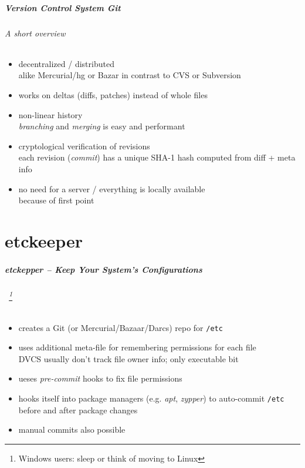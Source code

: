 \documentclass[english,hyperref={pdfpagelabels=false},aspectratio=169]{beamer}
\begin{document}
\begin{frame}[label=git]
  \frametitle{Version Control System \textit{Git}}
  \framesubtitle{A short overview}
  \begin{itemize}
    \item decentralized / distributed\\
      {\scriptsize alike Mercurial/hg or Bazar in contrast to CVS or Subversion}
    \item works on deltas {\scriptsize\color{fzjgray50}(diffs, patches)} instead of whole files
    \item non-linear history\\
      {\scriptsize \textit{branching} and \textit{merging} is easy and performant}
    \item cryptological verification of revisions\\
      {\scriptsize each revision (\textit{commit}) has a unique SHA-1 hash computed from diff + meta info}
    \item no need for a server / everything is locally available\\
      {\scriptsize because of first point}
  \end{itemize}
\end{frame}



\part{etckeeper}
\makepart

\begin{frame}[label=etckeeper]
  \frametitle{etckepper -- Keep Your System's Configurations}
  \framesubtitle{~\footnote{\tiny Windows users: sleep or think of moving to Linux}}
  \begin{itemize}
    \item creates a Git {\scriptsize\color{fzjgray50}(or Mercurial/Bazaar/Darcs)} repo for \texttt{/etc}
    \item uses additional meta-file for remembering permissions for each file\\
      {\scriptsize DVCS usually don't track file owner info; only executable bit}
    \item ueses \textit{pre-commit} hooks to fix file permissions
    \item hooks itself into package managers {\scriptsize\color{fzjgray50}(e.g. \textit{apt}, \textit{zypper})} to auto-commit \texttt{/etc} before and after package changes
    \item manual commits also possible
  \end{itemize}
\end{frame}
\end{document}
